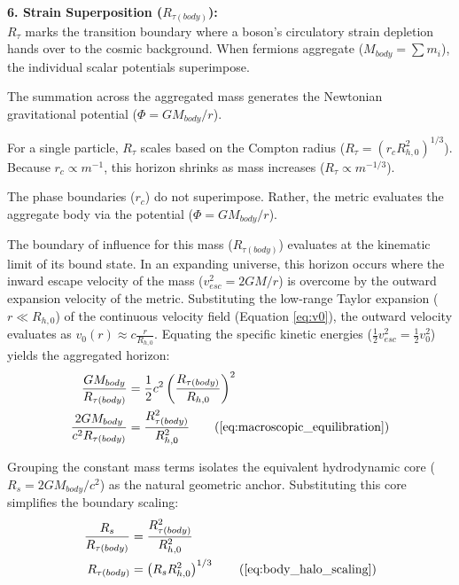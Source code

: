 \vspace{0.2 cm}

\textbf{6. Strain Superposition ($R_{\tau(body)}$):} \\
$R_{\tau}$ marks the transition boundary where a boson's circulatory strain depletion hands over to the cosmic background. When fermions aggregate ($M_{body} = \sum m_i$), the individual scalar potentials superimpose. 

The summation across the aggregated mass generates the Newtonian gravitational potential ($\Phi = G M_{body} / r$). 

\vspace{0.2 cm}

For a single particle, $R_\tau$ scales based on the Compton radius ($R_\tau = (r_c R_{h,0}^2)^{1/3}$). Because $r_c \propto m^{-1}$, this horizon shrinks as mass increases ($R_\tau \propto m^{-1/3}$). 

The phase boundaries ($r_c$) do not superimpose. Rather, the metric evaluates the aggregate body via the potential ($\Phi = G M_{body} / r$). 

The boundary of influence for this mass ($R_{\tau(body)}$) evaluates at the kinematic limit of its bound state. In an expanding universe, this horizon occurs where the inward escape velocity of the mass ($v_{esc}^2 = 2GM/r$) is overcome by the outward expansion velocity of the metric. Substituting the low-range Taylor expansion ($r \ll R_{h,0}$) of the continuous velocity field (Equation \ref{eq:v0}), the outward velocity evaluates as $v_0(r) \approx c \frac{r}{R_{h,0}}$. Equating the specific kinetic energies ($\frac{1}{2}v_{esc}^2 = \frac{1}{2}v_0^2$) yields the aggregated horizon:
\begin{align}
    \frac{G M_{body}}{R_{\tau(body)}} &= \frac{1}{2}c^2 \left(\frac{R_{\tau(body)}}{R_{h,0}}\right)^2 \nonumber \\
    \frac{2 G M_{body}}{c^2 R_{\tau(body)}} &= \frac{R_{\tau(body)}^2}{R_{h,0}^2} \tag{\ref{eq:macroscopic_equilibration}}
\end{align}

Grouping the constant mass terms isolates the equivalent hydrodynamic core ($R_s = 2GM_{body}/c^2$) as the natural geometric anchor. Substituting this core simplifies the boundary scaling:
\begin{align}
    \frac{R_s}{R_{\tau(body)}} &= \frac{R_{\tau(body)}^2}{R_{h,0}^2} \nonumber \\
    R_{\tau(body)} &= \left( R_s R_{h,0}^2 \right)^{1/3} \tag{\ref{eq:body_halo_scaling}}
\end{align}

